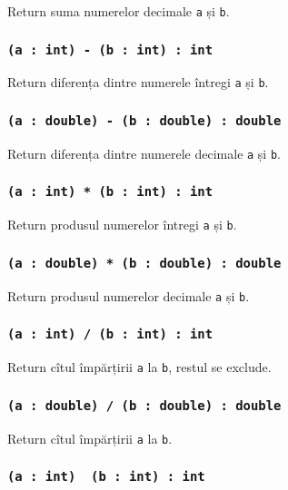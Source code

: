Return suma numerelor decimale \texttt{a} și \texttt{b}.

\subsubsection{\texttt{(a : int) - (b : int) : int}}

Return diferența dintre numerele întregi \texttt{a} și \texttt{b}.

\subsubsection{\texttt{(a : double) - (b : double) : double}}

Return diferența dintre numerele decimale \texttt{a} și \texttt{b}.

\subsubsection{\texttt{(a : int) * (b : int) : int}}

Return produsul numerelor întregi \texttt{a} și \texttt{b}.

\subsubsection{\texttt{(a : double) * (b : double) : double}}

Return produsul numerelor decimale \texttt{a} și \texttt{b}.

\subsubsection{\texttt{(a : int) / (b : int) : int}}

Return cîtul împărțirii \texttt{a} la \texttt{b}, restul se exclude.

\subsubsection{\texttt{(a : double) / (b : double) : double}}

Return cîtul împărțirii \texttt{a} la \texttt{b}.

\subsubsection{\texttt{(a : int) \ (b : int) : int}}

